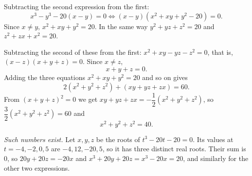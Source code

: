 Subtracting the second expression from the first:
\[x^3-y^3-20(x-y)=0\iff(x-y)\left(x^2+xy+y^2-20\right)=0 .\]
Since $x\ne y$, $x^2+xy+y^2=20$. In the same way $y^2+yz+z^2=20$ and $z^2+zx+x^2=20$.

Subtracting the second of these from the first: $x^2+xy-yz-z^2=0$, that is, $(x-z)(x+y+z)=0$. Since $x\ne z$,
\[x+y+z=0 .\]
Adding the three equations $x^2+xy+y^2=20$ and so on gives
\[2\left(x^2+y^2+z^2\right)+(xy+yz+zx)=60 .\]
From $(x+y+z)^2=0$ we get $xy+yz+zx=-\dfrac{1}{2}\left(x^2+y^2+z^2\right)$, so $\dfrac{3}{2}\left(x^2+y^2+z^2\right)=60$ and
\[x^2+y^2+z^2=\boxed{40}.\]

\emph{Such numbers exist.} Let $x,y,z$ be the roots of $t^3-20t-20=0$. Its values at $t=-4,-2,0,5$ are $-4,12,-20,5$, so it has three distinct real roots. Their sum is $0$, so $20y+20z=-20x$ and $x^3+20y+20z=x^3-20x=20$, and similarly for the other two expressions.

